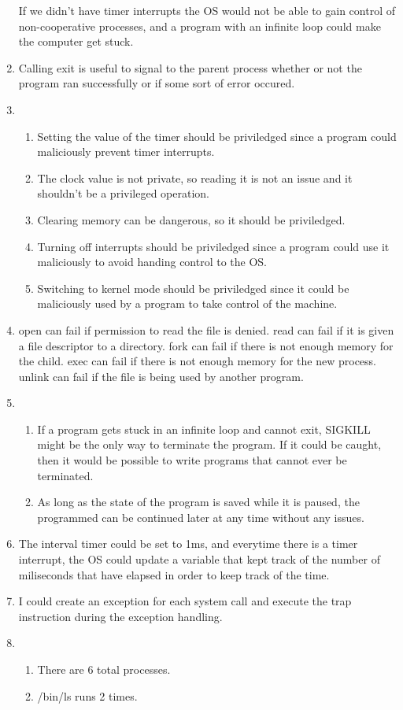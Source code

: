 \documentclass{article}
\begin{document}
\begin{enumerate}
    If we didn't have timer interrupts the OS would not be able to gain control of non-cooperative processes,
    and a program with an infinite loop could make the computer get stuck.
    \item Calling exit is useful to signal to the parent process whether or not
    the program ran successfully or if some sort of error occured.
    \item \begin{enumerate}
        \item Setting the value of the timer should be priviledged since
        a program could maliciously prevent timer interrupts.
        \item The clock value is not private, so reading it is not an issue
        and it shouldn't be a privileged operation.
        \item Clearing memory can be dangerous, so it should be priviledged.
        \item Turning off interrupts should be priviledged since a program could 
        use it maliciously to avoid handing control to the OS.
        \item Switching to kernel mode should be priviledged since it could be maliciously
        used by a program to take control of the machine.
    \end{enumerate}
    \item open can fail if permission to read the file is denied.
    read can fail if it is given a file descriptor to a directory.
    fork can fail if there is not enough memory for the child.
    exec can fail if there is not enough memory for the new process.
    unlink can fail if the file is being used by another program.
    \item \begin{enumerate}
        \item If a program gets stuck in an infinite loop and cannot exit,
        SIGKILL might be the only way to terminate the program.
        If it could be caught, then it would be possible to write programs that cannot
        ever be terminated.
        \item As long as the state of the program is saved while it is paused,
        the programmed can be continued later at any time without any issues.
    \end{enumerate}
    \item The interval timer could be set to 1ms, and everytime there is a timer interrupt,
    the OS could update a variable that kept track of the number of miliseconds that have 
    elapsed in order to keep track of the time.
    \item I could create an exception for each system call and execute 
    the trap instruction during the exception handling.
    \item \begin{enumerate}
        \item There are 6 total processes.
        \item /bin/ls runs 2 times.
    \end{enumerate}
\end{enumerate}
\end{document}
